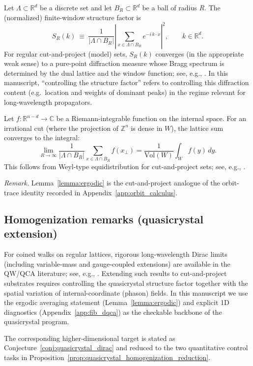 \begin{definition}
Let $\Lambda\subset\mathbb{R}^d$ be a discrete set and let $B_R\subset\mathbb{R}^d$ be a ball of radius $R$. The (normalized) finite-window structure factor is
\begin{equation}
    S_R(k)\ \equiv\ \frac{1}{|\Lambda\cap B_R|}\left|\sum_{x\in\Lambda\cap B_R} e^{-i\,k\cdot x}\right|^2,\qquad k\in\mathbb{R}^d.
\end{equation}
For regular cut-and-project (model) sets, $S_R(k)$ converges (in the appropriate weak sense) to a pure-point diffraction measure whose Bragg spectrum is determined by the dual lattice and the window function; see, e.g., \cite{Hof1995,BaakeGrimm2013AperiodicOrder}. In this manuscript, ``controlling the structure factor'' refers to controlling this diffraction content (e.g.\ location and weights of dominant peaks) in the regime relevant for long-wavelength propagators.
\end{definition}

\begin{lemma}
\label{lemma:ergodic}
Let $f: \mathbb{R}^{n-d} \to \mathbb{C}$ be a Riemann-integrable function on the internal space. For an irrational cut (where the projection of $\mathbb{Z}^n$ is dense in $W$), the lattice sum converges to the integral:
\begin{equation}
    \lim_{R \to \infty} \frac{1}{|\Lambda \cap B_R|} \sum_{x \in \Lambda \cap B_R} f(x_\perp)
    = \frac{1}{\mathrm{Vol}(W)} \int_W f(y)\,dy.
\end{equation}
This follows from Weyl-type equidistribution for cut-and-project sets; see, e.g., \cite{Hof1995,BaakeGrimm2013AperiodicOrder}.
\end{lemma}
\noindent\textit{Remark.} Lemma~\ref{lemma:ergodic} is the cut-and-project analogue of the orbit-trace identity recorded in Appendix~\ref{app:orbit_calculus}.

\subsection{Homogenization remarks (quasicrystal extension)}
For coined walks on regular lattices, rigorous long-wavelength Dirac limits (including variable-mass and gauge-coupled extensions) are available in the QW/QCA literature; see, e.g., \cite{Arrighi2014,Dariano2014,Bisio2015}. Extending such results to cut-and-project substrates requires controlling the quasicrystal structure factor together with the spatial variation of internal-coordinate (phason) fields. In this manuscript we use the ergodic averaging statement (Lemma~\ref{lemma:ergodic}) and explicit 1D diagnostics (Appendix~\ref{app:fib_dqca}) as the checkable backbone of the quasicrystal program.\par
\noindent
The corresponding higher-dimensional target is stated as Conjecture~\ref{conj:quasicrystal_dirac} and reduced to the two quantitative control tasks in Proposition~\ref{prop:quasicrystal_homogenization_reduction}.

